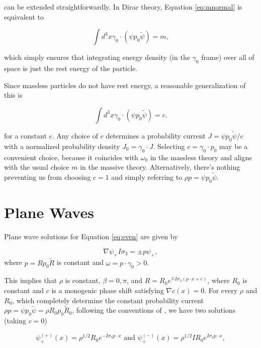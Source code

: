 \documentclass{article}
\begin{document}
  can be extended straightforwardly. In Dirac theory, Equation \ref{eq:mnormal} is equivalent to

  \begin{equation}
    \int d^3x \gamma_0 \cdot (\psi p_0 \widetilde \psi) = m,
  \end{equation}

  which simply ensures that integrating energy density (in the $\gamma_0$ frame) over all of space is just the rest energy of the particle.

  Since massless particles do not have rest energy, a reasonable generalization of this is

  \begin{equation}
    \int d^3x \gamma_0 \cdot (\psi p_0 \widetilde \psi) = c. \label{eq:normalization}
  \end{equation}

  for a constant $c$. Any choice of $c$ determines a probability current $J = \psi p_0 \widetilde \psi / c$ with a normalized probability density $J_0 = \gamma_0 \cdot J$. Selecting $c = \gamma_0 \cdot p_0$ may be a convenient choice, because it coincides with $\omega_0$ in the massless theory and aligns with the usual choice $m$ in the massive theory. Alternatively, there's nothing preventing us from choosing $c = 1$ and simply referring to $\rho p = \psi p_0 \widetilde \psi$.

  \section{Plane Waves} \label{waves}

  Plane wave solutions for Equation \ref{eq:even} are given by

  \begin{equation}
    \nabla \psi_+ I \sigma_3 = \pm p \psi_+,\label{eq:plane}
  \end{equation}
  where $p = R p_0 \widetilde R$ is constant and $\omega = p \cdot \gamma_0 > 0$.

  This implies that $\rho$ is constant, $\beta = 0, \pi$, and $R = R_0 e^{\mp I \sigma_3 (p \cdot x + c)}$, where $R_0$ is constant and $c$ is a monogenic phase shift satisfying $\nabla c(x) = 0$. For every $\rho$ and $R_0$, which completely determine the constant probability current $\rho p = \psi p_0 \widetilde \psi = \rho R_0 p_0 \widetilde R_0$, following the conventions of \cite{gap}, we have two solutions (taking $c = 0$)

  \begin{equation}
    \psi^{(+)}_+(x) = \rho^{1/2} R_0 e^{- I \sigma_3 p \cdot x} \text { and } \psi^{(-)}_+(x) = \rho^{1/2} I R_0 e^{I \sigma_3 p \cdot x},
  \end{equation} 
\end{document}
